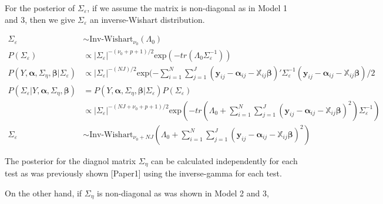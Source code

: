 \documentclass[
]{article}
\begin{document}
For the posterior of \(\Sigma_\varepsilon\), if we assume the matrix is non-diagonal as in Model 1 and 3, then we give \(\Sigma_\varepsilon\) an inverse-Wishart distribution.

\begin{equation*}
\begin{aligned}
\Sigma_\varepsilon &\sim \text{Inv-Wishart}_{\nu_0}(\Lambda_0)\\
P(\Sigma_\varepsilon) &\propto |\Sigma_\varepsilon|^{-(\nu_0+p+1)/2}\text{exp}(-tr(\Lambda_0\Sigma_\varepsilon^{-1}))\\
P(Y, \boldsymbol{\alpha}, \Sigma_\eta, \boldsymbol{\beta}|\Sigma_\varepsilon) &\propto |\Sigma_\varepsilon|^{-(NJ)/2}\text{exp}(-\sum^N_{i = 1}\sum^J_{j= 1} (\boldsymbol{y}_{ij} - \boldsymbol{\alpha}_{ij} - \boldsymbol{ \mathbb{X}}_{ij}\boldsymbol{\beta})'\Sigma_\varepsilon^{-1}(\boldsymbol{y}_{ij} - \boldsymbol{\alpha}_{ij} - \boldsymbol{ \mathbb{X}}_{ij}\boldsymbol{\beta})/2 \\
P(\Sigma_\varepsilon|Y, \boldsymbol{\alpha}, \Sigma_\eta, \boldsymbol{\beta}) & = P(Y, \boldsymbol{\alpha}, \Sigma_\eta, \boldsymbol{\beta}|\Sigma_\varepsilon)P(\Sigma_\varepsilon) \\ &\propto |\Sigma_\varepsilon|^{-(NJ +\nu_0+p+1)/2}\text{exp}(-tr(\Lambda_0 + \sum^N_{i = 1}\sum^J_{j= 1} (\boldsymbol{y}_{ij} - \boldsymbol{\alpha}_{ij} - \boldsymbol{ \mathbb{X}}_{ij}\boldsymbol{\beta})^2)\Sigma_\varepsilon^{-1})\\
\Sigma_\varepsilon & \sim \text{Inv-Wishart}_{\nu_0 + NJ}(\Lambda_0+\sum^N_{i = 1}\sum^J_{j= 1} (\boldsymbol{y}_{ij} - \boldsymbol{\alpha}_{ij} - \boldsymbol{ \mathbb{X}}_{ij}\boldsymbol{\beta})^2)
\end{aligned}
\end{equation*}

The posterior for the diagnol matrix \(\Sigma_\eta\) can be calculated independently for each test as was previously shown {[}Paper1{]} using the inverse-gamma for each test.

On the other hand, if \(\Sigma_\eta\) is non-diagonal as was shown in Model 2 and 3,
\end{document}
